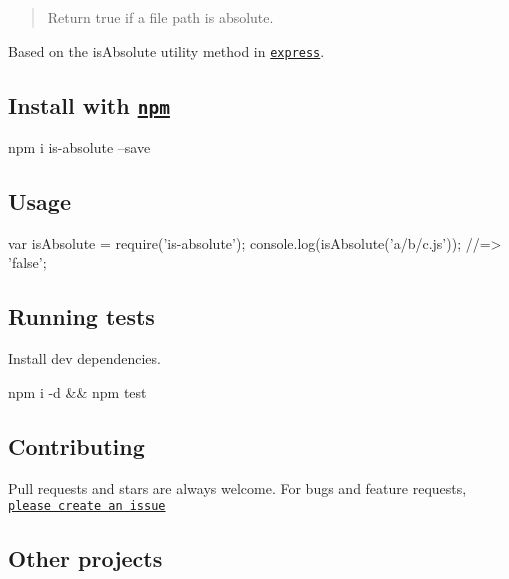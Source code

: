 \begin{quote}
Return true if a file path is absolute. \end{quote}


Based on the {\ttfamily is\+Absolute} utility method in \href{https://github.com/visionmedia/express}{\tt express}.

\subsection*{Install with \href{npmjs.org}{\tt npm}}


\begin{DoxyCode}
npm i is-absolute --save
\end{DoxyCode}


\subsection*{Usage}


\begin{DoxyCode}
var isAbsolute = require('is-absolute');
console.log(isAbsolute('a/b/c.js'));
//=> 'false';
\end{DoxyCode}


\subsection*{Running tests}

Install dev dependencies.


\begin{DoxyCode}
npm i -d && npm test
\end{DoxyCode}


\subsection*{Contributing}

Pull requests and stars are always welcome. For bugs and feature requests, \href{https://github.com/jonschlinkert/is-absolute/issues}{\tt please create an issue}

\subsection*{Other projects}


